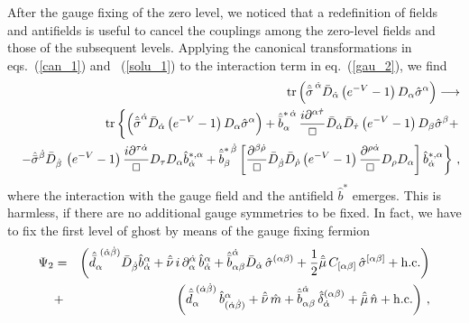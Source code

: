 \documentclass[a4paper,12pt]{article}
\begin{document}
After the gauge fixing of the zero level, we noticed that a
redefinition of fields and antifields is useful to cancel the
couplings among the zero-level fields and those of the subsequent
levels.  Applying the canonical transformations in eqs.~(\ref{can_1})
and ~(\ref{solu_1}) to the interaction term in eq.~(\ref{gau_2}), we
find
\begin{eqnarray}
  \label{gau_4}
&&{\rm tr} \left(  {\hat{\bar\sigma}}^{\,\dot \alpha} \bar D_{\dot
    \alpha} \left( e^{-V} -1 \right) D_\alpha  
{\hat\sigma}^\alpha \right) \longrightarrow  \nonumber \\
&&{\rm tr} \left\{ \left(  {\hat{\bar \sigma}}^{\dot \alpha} \bar
    D_{\dot \alpha} \left( e^{-V} -1 \right) D_\alpha  
{\hat\sigma}^\alpha \right) + 
{\hat{\bar b}}^{*\,\dot\alpha}_\alpha  \, {i \partial^{\alpha \dot\tau} \over
    \Box}  \bar D_{\dot\alpha} \bar D_{\dot \tau}
    \left( e^{-V} -1 \right)  D_\beta {\hat\sigma}^\beta +  
\right. \\ 
&& \left. - \hat{\bar \sigma}^{\dot \beta} \bar D_{\dot \beta}
  \, \left( e^{-V} -1 \right)  {i \partial^{\tau \dot\alpha} \over \Box}
   D_{\tau} D_{\alpha}   {{\hat b}}^{*,\alpha}_{\dot\alpha} +
{\hat{\bar b}}^{*\,\dot\beta}_\beta \left[ {\partial^{\beta \dot\rho}
    \over \Box} 
  \bar D_{\dot\beta} \bar D_{\dot\rho} 
  \left( e^{-V} -1 \right)  
{\partial^{\rho \dot\alpha} \over \Box}  D_\rho D_\alpha
\right]  {{\hat
  b}}^{*,\alpha}_{\dot\alpha} 
\right\}\,,
\nonumber
\end{eqnarray}
where the interaction with the gauge field and the antifield $\hat
b^*$ emerges. This is harmless, if there are no additional gauge
symmetries to be fixed. In fact, we have to fix the first level of ghost
by means of the gauge fixing fermion
\begin{eqnarray}
  \label{Psi2}
  \Psi_2 &=&\left( {\hat{\bar d}}^{~({\dot\alpha}\dot\beta)}_\alpha \bar
    D_{\dot\beta}
    {\hat b}^\alpha_{\dot\alpha} +  
    {\hat{\bar \nu}}\, i \, \partial^{\dot\alpha}_\alpha\, {\hat
      b}^\alpha_{\dot\alpha} +  
  {\hat{\bar b}}_{\alpha\beta}^{\dot\alpha} \bar D_{\dot\alpha} \,
  \hat\sigma^{(\alpha\beta)} +  
  {1\over 2}{\hat{\bar \mu}} \, C_{[\alpha\beta]} \,
  \hat\sigma^{[\alpha\beta]} + 
  {\rm h.c.}\right) \nonumber \\ 
  &+& \left( {\hat{\bar d}}^{\,\,(\dot\alpha \dot\beta)}_\alpha\, {\hat
      b}^\alpha_{(\dot\alpha \dot\beta)}  
    + {\hat{\bar \nu}}\, \hat m +  {\hat{\bar
        b}}_{\alpha\beta}^{\dot\alpha} \, \hat 
    \delta^{(\alpha \beta)}_{\dot\alpha} + {\hat{\bar \mu}} \, \hat n
    + {\rm h.c.} 
  \right) \,, 
\end{eqnarray}
\end{document}
